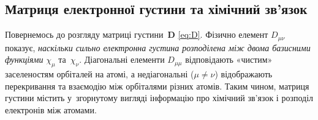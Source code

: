 %
%

\subsection{Матриця електронної густини та хімічний зв'язок}

Повернемось до розгляду матриці густини~$\mathbf{D}$ \eqref{eq:D}.
Фізично елемент $D_{\mu\nu}$ показує, \emph{наскільки сильно електронна густина розподілена між двома базисними функціями}
$\chi_\mu$ та~$\chi_\nu$.
Діагональні елементи $D_{\mu\mu}$ відповідають «чистим» заселеностям
орбіталей на атомі, а недіагональні ($\mu\ne\nu$)
відображають перекривання та взаємодію між орбіталями різних атомів.
Таким чином, матриця густини містить у~згорнутому вигляді
інформацію про хімічний зв’язок і розподіл електронів між атомами.

